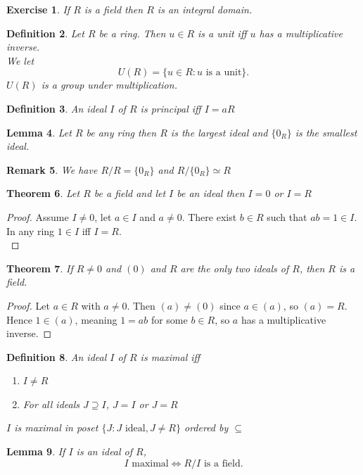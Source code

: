\documentclass[a4paper,12pt]{article}
\newtheorem{thm}{Theorem}[section]
\newtheorem{lem}[thm]{Lemma}
\newtheorem{defn}[thm]{Definition}
\newtheorem{ex}[thm]{Exercise}
\newtheorem{rmk}[thm]{Remark}
\begin{document}
\begin{ex}
    If $R$ is a field then $R$ is an integral domain.
\end{ex}
\begin{defn}
    Let $R$ be a ring. Then $u\in R$ is a unit iff $u$ has a multiplicative inverse. \\
    We let \[
        U(R)=\{u\in R: u \text{ is a unit}\}
    .\] 
    $U(R)$ is a group under multiplication.
\end{defn}
\begin{defn}
    An ideal $I$ of $R$ is principal iff $I=aR$
\end{defn}
\begin{lem}
    Let $R$ be any ring then $R$ is the largest ideal and $ \{ 0_R\}$ is the smallest ideal. 
\end{lem}
\begin{rmk}
    We have $R/R=\{0_R\}$ and $R/\{0_R\}\simeq R$
\end{rmk}
\begin{thm}
    Let $R$ be a field and let $I$ be an ideal then $I=0$ or $I=R$
\end{thm}
\begin{proof}
    Assume $I\neq 0$, let $a\in I$ and $a\neq 0$. There exist $b\in R$ such that $ab=1\in I$. In any ring $1\in I$ iff $I=R$. \\
\end{proof}
\begin{thm}
    If $R\neq 0$ and $(0)$ and $R$ are the only two ideals of $R$, then $R$ is a field. 
\end{thm}
\begin{proof}
    Let $a\in R$ with $a\neq 0$. Then $(a)\neq (0)$ since $a\in (a)$, so $(a)=R$. Hence $1\in (a)$, meaning $1=ab$ for some $b\in R$, so $a$ has a multiplicative inverse.  
\end{proof}
\begin{defn}
    An ideal $I$ of $R$ is maximal iff 
    \begin{enumerate}
        \item $I\neq R$
        \item For all ideals $J\supseteq I$, $J=I$ or $J=R$ 
    \end{enumerate}
    $I$ is maximal in poset $ \{J: J \text{ ideal}, J\neq R\}$ ordered by $\subseteq$
\end{defn}
\begin{lem}
    If $I$ is an ideal of $R$, \[
    I \text{ maximal} \iff R/I \text{ is a field}
    .\] 
\end{lem}
\end{document}
